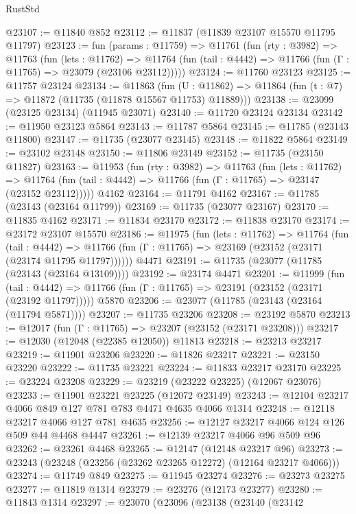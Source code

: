\begin{lexlean}{RustStd}
\begin{coremodule}
@23107 := @11840 @852
@23112 := @11837 (@11839 @23107 @15570 @11795 @11797)
@23123 := fun (params : @11759) =>
  @11761
    (fun (rty : @3982) =>
    @11763
      (fun (lets : @11762) =>
      @11764 (fun (tail : @4442) => @11766 (fun (Γ : @11765) => @23079 (@23106 @23112)))))
@23124 := @11760 @23123
@23125 := @11757 @23124
@23134 := @11863
    (fun (U : @11862) => @11864 (fun (t : @7) => @11872 (@11735 (@11878 @15567 @11753) @11889)))
@23138 := @23099 (@23125 @23134) (@11945 @23071)
@23140 := @11720 @23124 @23134
@23142 := @11950 @23123 @5864
@23143 := @11787 @5864
@23145 := @11785 (@23143 @11800)
@23147 := @11735 (@23077 @23145)
@23148 := @11822 @5864
@23149 := @23102 @23148
@23150 := @11806 @23149
@23152 := @11735 (@23150 @11827)
@23163 := @11953
    (fun (rty : @3982) =>
    @11763
      (fun (lets : @11762) =>
      @11764 (fun (tail : @4442) => @11766 (fun (Γ : @11765) => @23147 (@23152 @23112)))))
    @4162
@23164 := @11791 @4162
@23167 := @11785 (@23143 (@23164 @11799))
@23169 := @11735 (@23077 @23167)
@23170 := @11835 @4162
@23171 := @11834 @23170
@23172 := @11838 @23170
@23174 := @23172 @23107 @15570
@23186 := @11975
    (fun (lets : @11762) =>
    @11764
      (fun (tail : @4442) =>
      @11766 (fun (Γ : @11765) => @23169 (@23152 (@23171 (@23174 @11795 @11797))))))
    @4471
@23191 := @11735 (@23077 (@11785 (@23143 (@23164 @13109))))
@23192 := @23174 @4471
@23201 := @11999
    (fun (tail : @4442) => @11766 (fun (Γ : @11765) => @23191 (@23152 (@23171 (@23192 @11797)))))
    @5870
@23206 := @23077 (@11785 (@23143 (@23164 (@11794 @5871))))
@23207 := @11735 @23206
@23208 := @23192 @5870
@23213 := @12017 (fun (Γ : @11765) => @23207 (@23152 (@23171 @23208)))
@23217 := @12030 (@12048 (@22385 @12050)) @11813
@23218 := @23213 @23217
@23219 := @11901 @23206
@23220 := @11826 @23217
@23221 := @23150 @23220
@23222 := @11735 @23221
@23224 := @11833 @23217 @23170
@23225 := @23224 @23208
@23229 := @23219 (@23222 @23225) (@12067 @23076)
@23233 := @11901 @23221 @23225 (@12072 @23149)
@23243 := @12104 @23217 @4066 @849 @127 @781 @783 @4471 @4635 @4066 @1314
@23248 := @12118 @23217 @4066 @127 @781 @4635
@23256 := @12127 @23217 @4066 @124 @126 @509 @44 @4468 @4447
@23261 := @12139 @23217 @4066 @96 @509 @96
@23262 := @23261 @4468
@23265 := @12147 (@12148 @23217 @96)
@23273 := @23243 (@23248 (@23256 (@23262 @23265 @12272) (@12164 @23217 @4066)))
@23274 := @11749 @849
@23275 := @11945 @23274
@23276 := @23273 @23275
@23277 := @11819 @1314
@23279 := @23276 (@12173 @23277)
@23280 := @11843 @1314
@23297 := @23070
    (@23096
      (@23138
        (@23140
          (@23142

\end{coremodule}
\end{lexlean}
